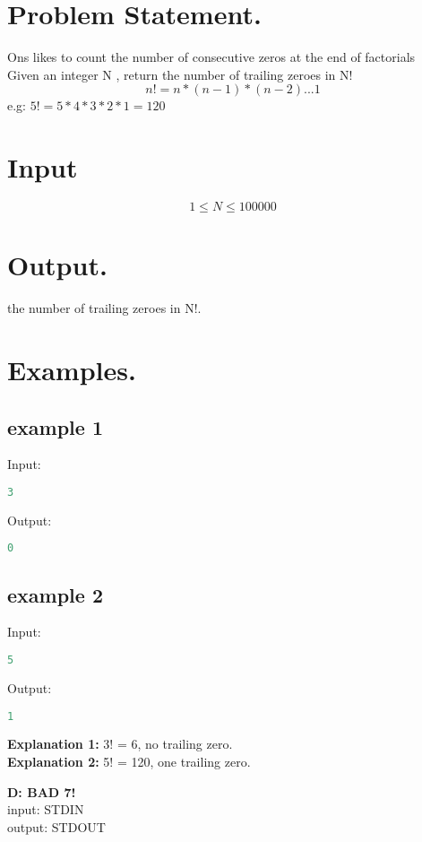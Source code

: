 \documentclass[10pt]{article}
\begin{document}
\section{Problem Statement.}
Ons likes to count the number of consecutive zeros at the end of factorials\\
Given an integer N , return the number of trailing zeroes in N! 
$$ n!= n*(n-1)*(n-2)...1 $$
e.g: $ 5!=5*4*3*2*1=120 $
\paragraph{}
\section{Input}
$$ 1\le N \le 100000 $$
\section{Output.}
the number of trailing zeroes in N!.
\section{Examples.}
\subsection{example 1}
Input:
\begin{lstlisting}[language=Python]
3
\end{lstlisting}
Output:
\begin{lstlisting}[language=Python]
0
\end{lstlisting}

\subsection{example 2}
Input:
\begin{lstlisting}[language=Python]
5
\end{lstlisting}
Output:
\begin{lstlisting}[language=Python]
1
\end{lstlisting}
\textbf{Explanation 1:} 3! = 6, no trailing zero.\\
\textbf{Explanation 2:} 5! = 120, one trailing zero.
\newpage
\begin{center}
    \Huge { \textbf{D: BAD 7!}}\\
    \normalsize  { input:  STDIN}\\
    \normalsize{    output: STDOUT}
\end{center}
\end{document}
